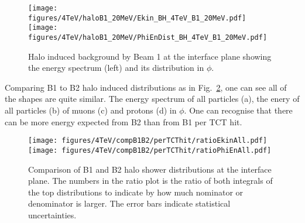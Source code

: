 \begin{figure}%
\begin{center}
\texttt{[image: figures/4TeV/haloB1\_20MeV/Ekin\_BH\_4TeV\_B1\_20MeV.pdf]}
\texttt{[image: figures/4TeV/haloB1\_20MeV/PhiEnDist\_BH\_4TeV\_B1\_20MeV.pdf]}
\end{center}
\vspace{-0.6cm}
 \caption{Halo induced background by Beam 1 at the interface plane showing the energy spectrum (left) and its distribution in $\phi$.
  \label{dist4TeVB1}}
\end{figure}

Comparing B1 to B2 halo induced distributions as in Fig.~\ref{comp4TeVB1B2}, one can see all of the shapes are quite similar. The energy spectrum of all particles (a), the enery of all particles (b) of muons (c) and protons (d) in $\phi$. One can recognise that there can be more energy expected from B2 than from B1 per TCT hit. 




\begin{figure}%
\begin{center}
\texttt{[image: figures/4TeV/compB1B2/perTCThit/ratioEkinAll.pdf]}
\texttt{[image: figures/4TeV/compB1B2/perTCThit/ratioPhiEnAll.pdf]}
\end{center}
\vspace{-0.6cm}
 \caption{Comparison of B1 and B2 halo shower distributions at the interface plane. The numbers in the ratio plot is the ratio of both integrals of the top distributions to indicate by how much nominator or denominator is larger. The error bars indicate statistical uncertainties.
  \label{comp4TeVB1B2}}
\end{figure}


